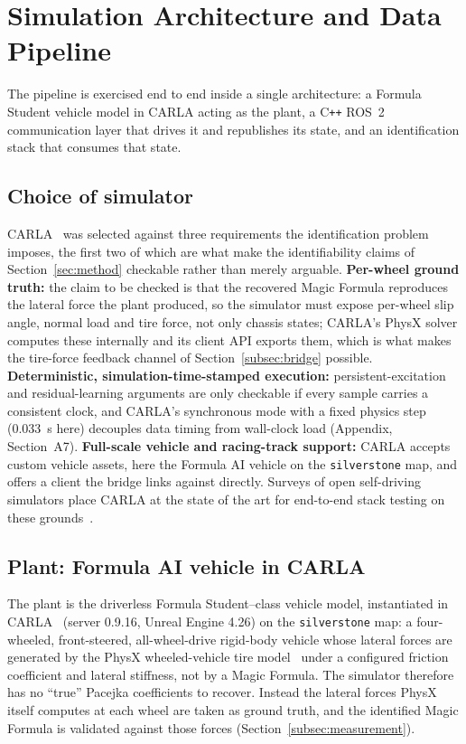 \section{Simulation Architecture and Data Pipeline}
\label{sec:platform}

The pipeline is exercised end to end inside a single architecture: a Formula
Student vehicle model in CARLA acting as the plant, a C\texttt{++} ROS~2
communication layer that drives it and republishes its state, and an
identification stack that consumes that state.

\subsection{Choice of simulator}
\label{subsec:whycarla}

CARLA~\cite{carla2017} was selected against three requirements the
identification problem imposes, the first two of which are what make the
identifiability claims of Section~\ref{sec:method} checkable rather than merely
arguable. \textbf{Per-wheel ground truth:} the claim to be checked is that the
recovered Magic Formula reproduces the lateral force the plant produced, so the
simulator must expose per-wheel slip angle, normal load and tire force, not
only chassis states; CARLA's PhysX solver computes these internally and its
client API exports them, which is what makes the tire-force feedback channel of
Section~\ref{subsec:bridge} possible. \textbf{Deterministic,
simulation-time-stamped execution:} persistent-excitation and residual-learning
arguments are only checkable if every sample carries a consistent clock, and
CARLA's synchronous mode with a fixed physics step (\SI{0.033}{\second} here)
decouples data timing from wall-clock load (Appendix, Section~A7).
\textbf{Full-scale vehicle and racing-track support:} CARLA accepts custom
vehicle assets, here the Formula AI vehicle on the \texttt{silverstone} map,
and offers a client the bridge links against directly. Surveys of open
self-driving simulators place CARLA at the state of the art for end-to-end
stack testing on these grounds~\cite{kaur2021simsurvey}.

\subsection{Plant: Formula AI vehicle in CARLA}
\label{subsec:platform}

The plant is the driverless Formula Student--class vehicle model, instantiated in
CARLA~\cite{carla2017} (server 0.9.16, Unreal Engine 4.26) on the
\texttt{silverstone} map: a four-wheeled, front-steered, all-wheel-drive
rigid-body vehicle whose lateral forces are generated by the PhysX
wheeled-vehicle tire model~\cite{physxvehicle} under a configured friction
coefficient and lateral stiffness, not by a Magic Formula. The simulator
therefore has no ``true'' Pacejka coefficients to recover. Instead the lateral
forces PhysX itself computes at each wheel are taken as ground truth, and the
identified Magic Formula is validated against those forces
(Section~\ref{subsec:measurement}).

